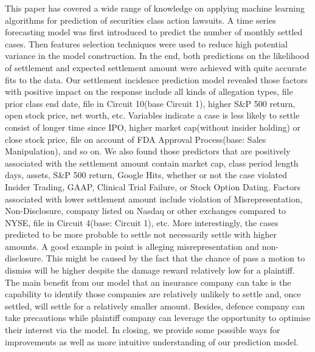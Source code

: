 \squeezeup
\squeezeup
This paper has covered a wide range of knowledge on applying machine learning algorithms for prediction of securities class action lawsuits. A time series forecasting model was first introduced to predict the number of monthly settled cases. Then features selection techniques were used to reduce high potential variance in the model construction. In the end, both predictions on the likelihood of settlement and expected settlement amount were achieved with quite accurate fits to the data. 
Our settlement incidence prediction model revealed those factors with positive impact on the response include all kinds of allegation types, file prior class end date, file in Circuit 10(base Circuit 1), higher S\&P 500 return, open stock price, net worth, etc. Variables indicate a case is less likely to settle consist of longer time since IPO, higher market cap(without insider holding) or close stock price, file on account of FDA Approval Process(base: Sales Manipulation), and so on. 
We also found those predictors that are positively associated with the settlement amount contain market cap, class period length days, assets, S\&P 500 return, Google Hits, whether or not the case violated Insider Trading, GAAP, Clinical Trial Failure, or Stock Option Dating. Factors associated with lower settlement amount include violation of Misrepresentation, Non-Disclosure, company listed on Nasdaq or other exchanges compared to NYSE, file in Circuit 4(base: Circuit 1), etc. 
More interestingly, the cases predicted to be more probable to settle not necessarily settle with higher amounts. A good example in point is alleging misrepresentation and non-disclosure. This might be caused by the fact that the chance of pass a motion to dismiss will be higher despite the damage reward relatively low for a plaintiff. 
The main benefit from our model that an insurance company can take is the capability to identify those companies are relatively unlikely to settle and, once settled, will settle for a relatively smaller amount. Besides, defence company can take precautions while plaintiff company can leverage the opportunity to optimise their interest via the model. 
In closing, we provide some possible ways for improvements as well as more intuitive understanding of our prediction model. 
